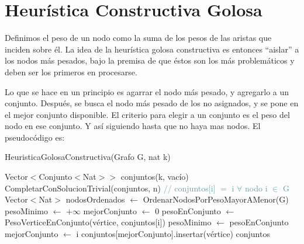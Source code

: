 \section{Heurística Constructiva Golosa}

Definimos el peso de un nodo como la suma de los pesos de las aristas que inciden sobre él. La idea de la heurística golosa constructiva es entonces ``aislar'' a los nodos más pesados, bajo la premisa de que éstos son los más problemáticos y deben ser los primeros en procesarse.

Lo que se hace en un principio es agarrar el nodo más pesado, y agregarlo a un conjunto. Después, se busca el nodo más pesado de los no asignados, y se pone en el mejor conjunto disponible. El criterio para elegir a un conjunto es el peso del nodo en ese conjunto. Y así siguiendo hasta que no haya mas nodos. El pseudocódigo es:
\begin{algorithm}[H]
\begin{algorithmic}[1]
\caption{HeuristicaGolosaConstructiva(Grafo G, nat k)}
\STATE Vector$<$Conjunto$<$Nat$>>$ conjuntos(k, vacío)
    \STATE CompletarConSolucionTrivial(conjuntos, n) \textcolor{CadetBlue}{// conjuntos$[$i$]$ $=$ i $\forall$ nodo i $\in$ G}
\ELSE
    \STATE Vector$<$Nat$>$ nodosOrdenados $\leftarrow$ OrdenarNodosPorPesoMayorAMenor(G)
        \STATE pesoMinimo $\leftarrow$ $+ \infty$
        \STATE mejorConjunto $\leftarrow$ 0
            \STATE pesoEnConjunto $\leftarrow$ PesoVerticeEnConjunto(vértice, conjuntos$[$i$]$)
                \STATE pesoMinimo $\leftarrow$ pesoEnConjunto
                \STATE mejorConjunto $\leftarrow$ i
            \ENDIF
        \ENDFOR
        \STATE conjuntos$[$mejorConjunto$]$.insertar(vértice)
    \ENDFOR
\ENDIF
\RETURN conjuntos
\end{algorithmic}
\end{algorithm}


